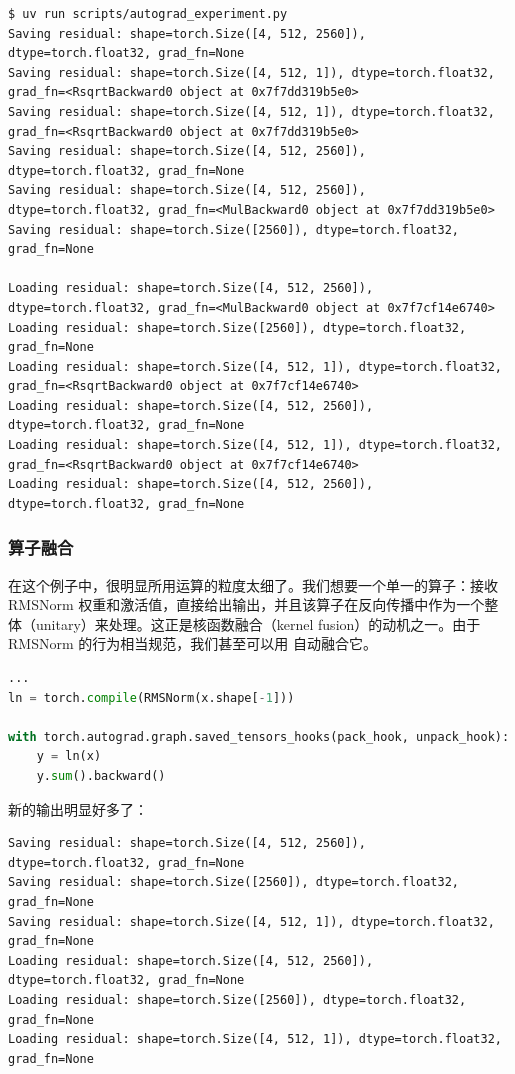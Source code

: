 \begin{lstlisting}
$ uv run scripts/autograd_experiment.py
Saving residual: shape=torch.Size([4, 512, 2560]), dtype=torch.float32, grad_fn=None
Saving residual: shape=torch.Size([4, 512, 1]), dtype=torch.float32, grad_fn=<RsqrtBackward0 object at 0x7f7dd319b5e0>
Saving residual: shape=torch.Size([4, 512, 1]), dtype=torch.float32, grad_fn=<RsqrtBackward0 object at 0x7f7dd319b5e0>
Saving residual: shape=torch.Size([4, 512, 2560]), dtype=torch.float32, grad_fn=None
Saving residual: shape=torch.Size([4, 512, 2560]), dtype=torch.float32, grad_fn=<MulBackward0 object at 0x7f7dd319b5e0>
Saving residual: shape=torch.Size([2560]), dtype=torch.float32, grad_fn=None

Loading residual: shape=torch.Size([4, 512, 2560]), dtype=torch.float32, grad_fn=<MulBackward0 object at 0x7f7cf14e6740>
Loading residual: shape=torch.Size([2560]), dtype=torch.float32, grad_fn=None
Loading residual: shape=torch.Size([4, 512, 1]), dtype=torch.float32, grad_fn=<RsqrtBackward0 object at 0x7f7cf14e6740>
Loading residual: shape=torch.Size([4, 512, 2560]), dtype=torch.float32, grad_fn=None
Loading residual: shape=torch.Size([4, 512, 1]), dtype=torch.float32, grad_fn=<RsqrtBackward0 object at 0x7f7cf14e6740>
Loading residual: shape=torch.Size([4, 512, 2560]), dtype=torch.float32, grad_fn=None
\end{lstlisting}

\subsubsection{算子融合}

在这个例子中，很明显所用运算的粒度太细了。我们想要一个单一的算子：接收 RMSNorm 权重和激活值，直接给出输出，并且该算子在反向传播中作为一个整体（unitary）来处理。这正是核函数融合（kernel fusion）的动机之一。由于 RMSNorm 的行为相当规范，我们甚至可以用  自动融合它。

\begin{lstlisting}[language=Python]
...
ln = torch.compile(RMSNorm(x.shape[-1]))

with torch.autograd.graph.saved_tensors_hooks(pack_hook, unpack_hook):
    y = ln(x)
    y.sum().backward()
\end{lstlisting}

新的输出明显好多了：

\begin{lstlisting}
Saving residual: shape=torch.Size([4, 512, 2560]), dtype=torch.float32, grad_fn=None
Saving residual: shape=torch.Size([2560]), dtype=torch.float32, grad_fn=None
Saving residual: shape=torch.Size([4, 512, 1]), dtype=torch.float32, grad_fn=None
Loading residual: shape=torch.Size([4, 512, 2560]), dtype=torch.float32, grad_fn=None
Loading residual: shape=torch.Size([2560]), dtype=torch.float32, grad_fn=None
Loading residual: shape=torch.Size([4, 512, 1]), dtype=torch.float32, grad_fn=None
\end{lstlisting}


